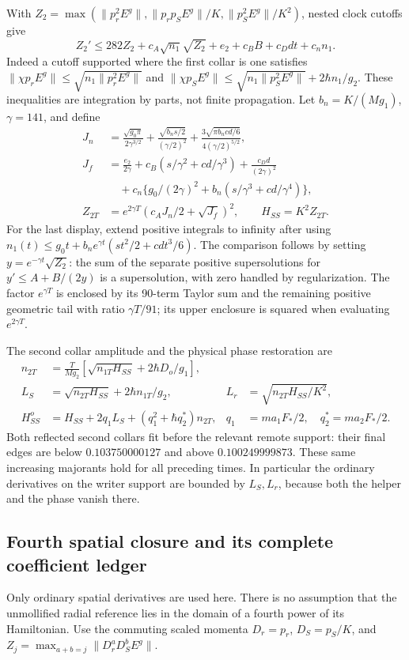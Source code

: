 \documentclass[11pt]{article}
\theoremstyle{definition}\newtheorem{definition}[theorem]{Definition}
\theoremstyle{remark}\newtheorem{remark}[theorem]{Remark}
\begin{document}
With $Z_2=\max(\|p_r^2E^g\|,\|p_rp_SE^g\|/K,
\|p_S^2E^g\|/K^2)$, nested clock cutoffs give
\[
 Z_2'\le282Z_2+c_A\sqrt{n_1}\sqrt{Z_2}
                   +e_2+c_BB+c_Ddt+c_nn_1.
\]
Indeed a cutoff supported where the first collar is one satisfies
$\|\chi p_rE^g\|\le\sqrt{n_1\|p_r^2E^g\|}$ and
$\|\chi p_SE^g\|\le\sqrt{n_1\|p_S^2E^g\|}+2\hbar n_1/g_2$.
These inequalities are integration by parts, not finite propagation.
Let $b_n=K/(Mg_1)$, $\gamma=141$, and define
\begin{align*}
 J_n&=\frac{\sqrt{g_0\pi}}{2\gamma^{3/2}}
       +\frac{\sqrt{b_ns/2}}{(\gamma/2)^2}
       +\frac{3\sqrt{\pi b_ncd/6}}{4(\gamma/2)^{5/2}},\\
 J_f&=\frac{e_2}{2\gamma}
       +c_B(s/\gamma^2+cd/\gamma^3)
       +\frac{c_Dd}{(2\gamma)^2}\\
 &\quad+c_n\{g_0/(2\gamma)^2+b_n(s/\gamma^3+cd/\gamma^4)\},\\
 Z_{2T}&=e^{2\gamma T}(c_AJ_n/2+\sqrt{J_f})^2,
 \qquad H_{SS}=K^2Z_{2T}. \label{prep:hessian-construction}
\end{align*}
For the last display, extend positive integrals to infinity after using
$n_1(t)\le g_0t+b_ne^{\gamma t}(st^2/2+cdt^3/6)$.
The comparison follows by setting $y=e^{-\gamma t}\sqrt{Z_2}$:
the sum of the separate positive supersolutions for $y'\le A+B/(2y)$
is a supersolution, with zero handled by regularization.
The factor $e^{\gamma T}$ is enclosed by its 90-term Taylor sum and
the remaining positive geometric tail with ratio $\gamma T/91$; its
upper enclosure is squared when evaluating $e^{2\gamma T}$.

The second collar amplitude and the physical phase restoration are
\begin{align}
 n_{2T}&=\frac{T}{Mg_2}
           [\sqrt{n_{1T}H_{SS}}+2\hbar D_o/g_1],\\
 L_S&=\sqrt{n_{2T}H_{SS}}+2\hbar n_{1T}/g_2,
 &L_r&=\sqrt{n_{2T}H_{SS}/K^2},\\
 H_{SS}^{o}&=H_{SS}+2q_1L_S+(q_1^2+\hbar q_2^*)n_{2T},
 &q_1&=ma_1F_*/2,\quad q_2^*=ma_2F_*/2.
 \label{prep:second-collar}
\end{align}
Both reflected second collars fit before the relevant remote support:
their final edges are below $0.103750000127$ and above
$0.100249999873$. These same increasing majorants hold for all preceding
times. In particular the ordinary derivatives on the writer support
are bounded by $L_S,L_r$, because both the helper and the phase vanish
there.

\subsection{Fourth spatial closure and its complete coefficient ledger}
\label{prep:fourth}
Only ordinary spatial derivatives are used here. There is no assumption
that the unmollified radial reference lies in the domain of a fourth
power of its Hamiltonian. Use the commuting scaled momenta
$D_r=p_r$, $D_S=p_S/K$, and
$Z_j=\max_{a+b=j}\|D_r^aD_S^bE^g\|$.
\end{document}
